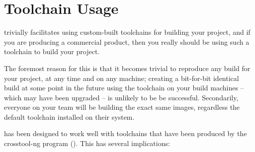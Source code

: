 %
%
%
%
\chapter{Toolchain Usage}\label{chap:toolchain-usage}



\lmsbw trivially facilitates using custom-built toolchains for
building your project, and if you are producing a commercial product,
then you really should be using such a toolchain to build your
project.

The foremost reason for this is that it becomes trivial to reproduce
any build for your project, at any time and on any machine; creating a
bit-for-bit identical build at some point in the future using the
toolchain on your build machines -- which may have been upgraded -- is
unlikely to be be successful.  Secondarily, everyone on your team will
be building the exact same images, regardless the default toolchain
installed on their system.

\lmsbw has been designed to work well with toolchains that have been
produced by the crosstool-ng program
().  This has several implications:


